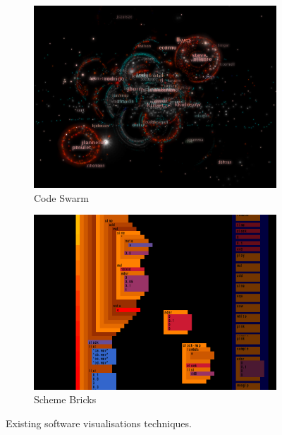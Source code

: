 \begin{figure}
\begin{subfigure}{.5\textwidth}
  \includegraphics[width=.95\linewidth]{../images/code-visualisations/code-swarm.png}
  \caption{Code Swarm}
  \label{fig:code-swarm}
\end{subfigure}%
\begin{subfigure}{.5\textwidth}
  \includegraphics[width=.95\linewidth]{../images/code-visualisations/scheme-bricks.png}
  \caption{Scheme Bricks}
  \label{fig:scheme-bricks}
\end{subfigure}

\caption[Existing software visualisations techniques]{Existing software visualisations techniques.}
\label{fig:code-visualisations}
\end{figure}